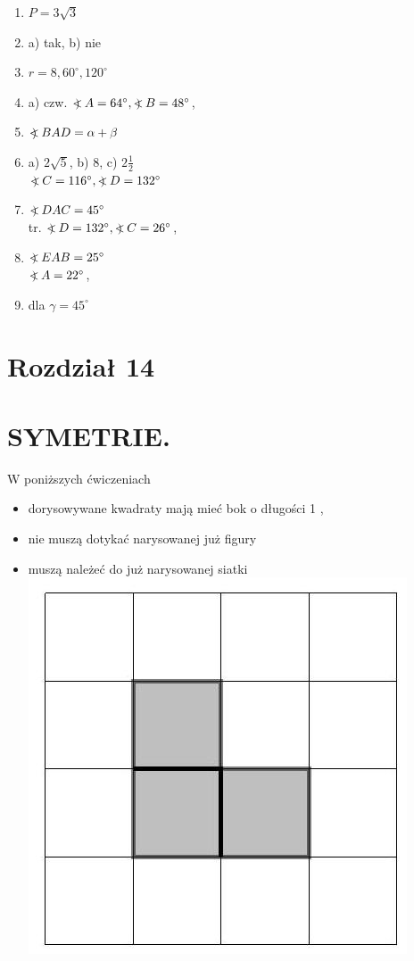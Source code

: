\documentclass[10pt]{article}
\newcommand\Varangle{\mathop{{<\!\!\!\!\!\text{\small)}}\:}\nolimits}
\begin{document}
\begin{enumerate}
  \item \(P=3 \sqrt{3}\)
  \item a) tak, b) nie
  \item \(r=8,60^{\circ}, 120^{\circ}\)
  \item a) czw. \(\Varangle A=64^{\circ}, \Varangle B=48^{\circ}\),
  \item \(\Varangle B A D=\alpha+\beta\)
  \item a) \(2 \sqrt{5}\), b) 8, c) \(2 \frac{1}{2}\)\\
\(\Varangle C=116^{\circ}, \Varangle D=132^{\circ}\)
  \item \(\Varangle D A C=45^{\circ}\)\\
tr. \(\Varangle D=132^{\circ}, \Varangle C=26^{\circ}\),
  \item \(\Varangle E A B=25^{\circ}\)\\
\(\Varangle A=22^{\circ}\),
  \item dla \(\gamma=45^{\circ}\)
\end{enumerate}

\section*{Rozdział 14}
\section*{SYMETRIE.}
W poniższych ćwiczeniach

\begin{itemize}
  \item dorysowywane kwadraty mają mieć bok o długości 1 ,
  \item nie muszą dotykać narysowanej już figury
  \item muszą należeć do już narysowanej siatki\\
\includegraphics[max width=\textwidth, center]{2024_11_21_71f62bd117d375398909g-204}
\end{itemize}
\end{document}
